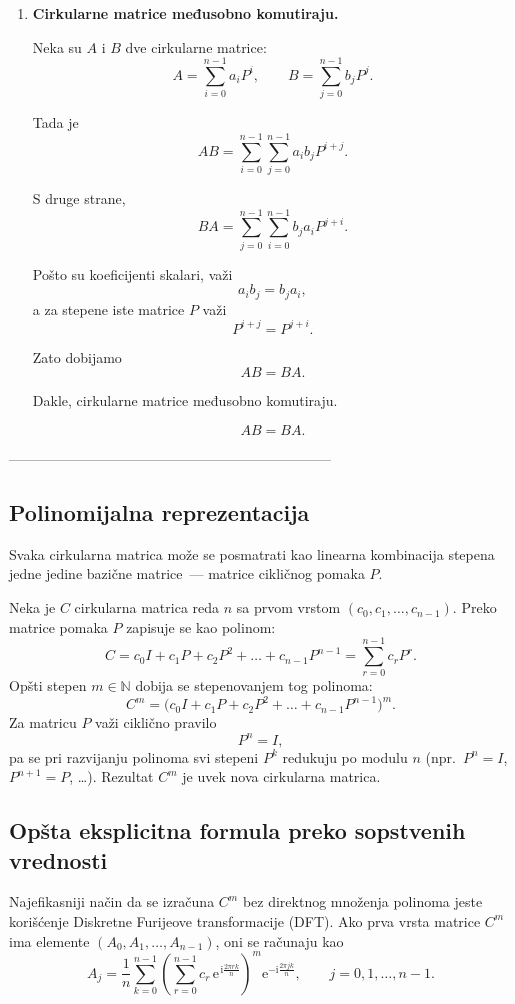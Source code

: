 \documentclass[12pt,a4paper]{report}
\newcommand{\I}{\mathrm{i}}
\newcommand{\E}{\mathrm{e}}
\begin{document}
\begin{enumerate}
	\[
	\boxed{A^{-1}\text{ je cirkularna matrica.}}
	\]
	
	\item \textbf{Cirkularne matrice međusobno komutiraju.}
	
	Neka su $A$ i $B$ dve cirkularne matrice:
	\[
	A=\sum_{i=0}^{n-1}a_iP^i,
	\qquad
	B=\sum_{j=0}^{n-1}b_jP^j.
	\]
	
	Tada je
	\[
	AB
	=
	\sum_{i=0}^{n-1}\sum_{j=0}^{n-1}
	a_ib_jP^{i+j}.
	\]
	
	S druge strane,
	\[
	BA
	=
	\sum_{j=0}^{n-1}\sum_{i=0}^{n-1}
	b_ja_iP^{j+i}.
	\]
	
	Pošto su koeficijenti skalari, važi
	\[
	a_ib_j=b_ja_i,
	\]
	a za stepene iste matrice $P$ važi
	\[
	P^{i+j}=P^{j+i}.
	\]
	
	Zato dobijamo
	\[
	AB=BA.
	\]
	
	Dakle, cirkularne matrice međusobno komutiraju.
	
	\[
	\boxed{AB=BA.}
	\]
\end{enumerate}

---------------------------------------------------------------------



\subsection{Polinomijalna reprezentacija}

Svaka cirkularna matrica može se posmatrati kao linearna kombinacija
stepena jedne jedine bazične matrice~--- matrice cikličnog pomaka $P$.

Neka je $C$ cirkularna matrica reda $n$ sa prvom vrstom
$(c_0, c_1, \dots, c_{n-1})$. Preko matrice pomaka $P$ zapisuje se kao polinom:
\[
C = c_0 I + c_1 P + c_2 P^2 + \dots + c_{n-1} P^{n-1}
= \sum_{r=0}^{n-1} c_r P^r .
\]
Opšti stepen $m \in \mathbb{N}$ dobija se stepenovanjem tog polinoma:
\[
C^m = \bigl(c_0 I + c_1 P + c_2 P^2 + \dots + c_{n-1} P^{n-1}\bigr)^m .
\]
Za matricu $P$ važi ciklično pravilo
\[
P^n = I ,
\]
pa se pri razvijanju polinoma svi stepeni $P^k$ redukuju po modulu $n$
(npr.\ $P^{n} = I$, $P^{n+1} = P$, \dots). Rezultat $C^m$ je uvek nova
cirkularna matrica.

\subsection{Opšta eksplicitna formula preko sopstvenih vrednosti}

Najefikasniji način da se izračuna $C^m$ bez direktnog množenja polinoma
jeste korišćenje Diskretne Furijeove transformacije (DFT). Ako prva vrsta
matrice $C^m$ ima elemente $(A_0, A_1, \dots, A_{n-1})$, oni se računaju kao
\[
A_j = \frac{1}{n} \sum_{k=0}^{n-1}
\left( \sum_{r=0}^{n-1} c_r\, \E^{\,\I \frac{2\pi r k}{n}} \right)^{\!m}
\E^{-\I \frac{2\pi j k}{n}} ,
\qquad j = 0, 1, \dots, n-1 .
\]
\end{document}
